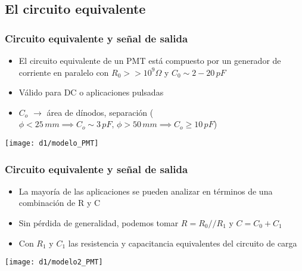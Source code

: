 \documentclass{beamer}
\begin{document}

\subsection{El circuito equivalente}

\begin{frame}
\frametitle{Circuito equivalente y señal de salida}
\begin{itemize}
\item El circuito equivalente de un PMT est\'a compuesto por un generador de
corriente en paralelo con $R_0 >> 10^9 \Omega$ y $C_0 \sim 2 - 20\,pF$
\item V\'alido para DC o aplicaciones pulsadas
\item $C_o$ $\rightarrow$ \'area de d\'inodos, separaci\'on ($\phi < 25\,mm \implies
C_o \sim 3\,pF,\, \phi > 50\,mm \implies C_o \geq 10\,pF$)
\end{itemize}
\begin{center}
\texttt{[image: d1/modelo\_PMT]}
\end{center}
\end{frame} 

\begin{frame}
\frametitle{Circuito equivalente y señal de salida}
\begin{itemize}
\item La mayor\'ia de las aplicaciones se pueden analizar en t\'erminos de una
combinaci\'on de R y C
\item Sin p\'erdida de generalidad, podemos tomar $R = R_0 // R_1$ y $C = C_0 + C_1$
\item Con $R_1$ y $C_1$ las resistencia y capacitancia equivalentes del circuito
de carga
\end{itemize}
\begin{center}
\texttt{[image: d1/modelo2\_PMT]}
\end{center}
\end{frame} 
\end{document}
